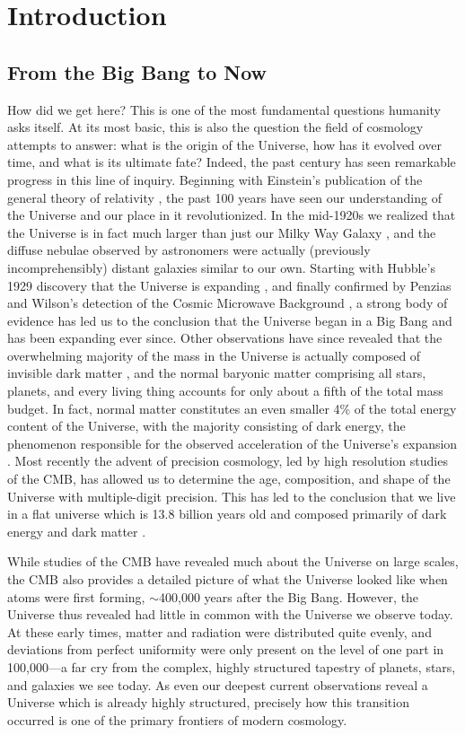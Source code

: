 \documentclass[../thesis.tex]{subfiles}
\begin{document}
\chapter{Introduction}
\section{From the Big Bang to Now}
How did we get here?  
This is one of the most fundamental questions humanity asks itself.  
At its most basic, this is also the question the field of cosmology attempts to answer: what is the origin of the Universe, how has it evolved over time, and what is its ultimate fate? 
Indeed, the past century has seen remarkable progress in this line of inquiry.
Beginning with Einstein's publication of the general theory of relativity \citep{Einstein1916}, the past 100 years have seen our understanding of the Universe and our place in it revolutionized. 
In the mid-1920s we realized that the Universe is in fact much larger than just our Milky Way Galaxy \citep{Hubble1925}, and the diffuse nebulae observed by astronomers were actually (previously incomprehensibly) distant galaxies similar to our own.
Starting with Hubble's 1929 discovery that the Universe is expanding \citep{Hubble1929}, and finally confirmed by Penzias and Wilson's detection of the Cosmic Microwave Background \citep[CMB;][]{PenziasWilson1965, Dickeetal1965}, a strong body of evidence has led us to the conclusion that the Universe began in a Big Bang and has been expanding ever since.
Other observations have since revealed that the overwhelming majority of the mass in the Universe is actually composed of invisible dark matter \citep{RubinThonnardFord1980}, and the normal baryonic matter comprising all stars, planets, and every living thing accounts for only about a fifth of the total mass budget. 
In fact, normal matter constitutes an even smaller 4\% of the total energy content of the Universe, with the majority consisting of dark energy, the phenomenon responsible for the observed acceleration of the Universe's expansion \citep{Riessetal1998, Perlmutteretal1999}.
Most recently the advent of precision cosmology, led by high resolution studies of the CMB, has allowed us to determine the age, composition, and shape of the Universe with multiple-digit precision.  
This has led to the conclusion that we live in a flat universe which is 13.8 billion years old and composed primarily of dark energy and dark matter \citep{PlanckParams2015}.

While studies of the CMB have revealed much about the Universe on large scales, the CMB also provides a detailed picture of what the Universe looked like when atoms were first forming, $\sim$400,000 years after the Big Bang. 
However, the Universe thus revealed had little in common with the Universe we observe today.  
At these early times, matter and radiation were distributed quite evenly, and deviations from perfect uniformity were only present on the level of one part in 100,000---a far cry from the complex, highly structured tapestry of planets, stars, and galaxies we see today.
As even our deepest current observations reveal a Universe which is already highly structured, precisely how this transition occurred is one of the primary frontiers of modern cosmology.
\end{document}
